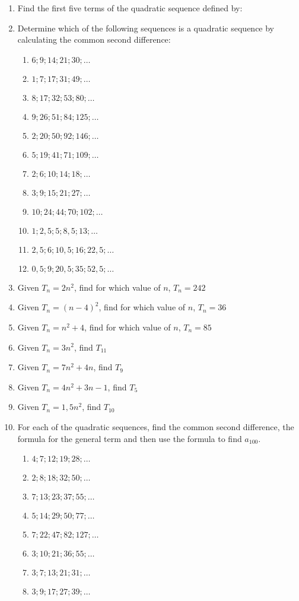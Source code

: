 \begin{eocexercises}{}
\begin{enumerate}
\item{Find the first five terms of the quadratic sequence defined by:
}
\item{Determine which of the following sequences is a quadratic sequence by calculating the common second difference:
\begin{enumerate}
\item $6; 9; 14; 21; 30;\ldots$
\item $1; 7; 17; 31; 49;\ldots$
\item $8; 17; 32; 53; 80;\ldots$
\item $9; 26; 51; 84; 125;\ldots$
\item $2; 20; 50; 92; 146;\ldots$
\item $5; 19; 41; 71; 109;\ldots$
\item $2; 6; 10; 14; 18;\ldots$
\item $3; 9; 15; 21; 27;\ldots$
\item $10; 24; 44; 70; 102;\ldots$
\item $1; 2,5; 5; 8,5; 13;\ldots$
\item $2,5; 6; 10,5; 16; 22,5;\ldots$
\item $0,5; 9; 20,5; 35; 52,5;\ldots$
\end{enumerate}}
\item{Given $T_n= 2n^2$, find for which value of $n$, $T_n=242$}
\item{Given $T_n= (n - 4)^2$, find for which value of $n$, $T_n=36$}
\item{Given $T_n= n^2+4$, find for which value of $n$, $T_n=85$}
\item{Given $T_n= 3n^2$, find $T_{11}$}
\item{Given $T_n= 7n^2+4n$, find $T_{9}$}
\item{Given $T_n= 4n^2+3n-1$, find $T_{5}$}
\item{Given $T_n= 1,5n^2$, find $T_{10}$}
\item{For each of the quadratic sequences, find the common second difference, the formula for the general term and then use the formula to find $a_{100}$.
\begin{enumerate}
\item $4;7;12;19;28;\ldots$
\item $2;8;18;32;50;\ldots$
\item $7;13;23;37;55;\ldots$
\item $5;14;29;50;77;\ldots$
\item $7;22;47;82;127;\ldots$
\item $3;10;21;36;55;\ldots$
\item $3;7;13;21;31;\ldots$
\item $3;9;17;27;39;\ldots$
\end{enumerate}}


\end{enumerate}
\end{eocexercises}
